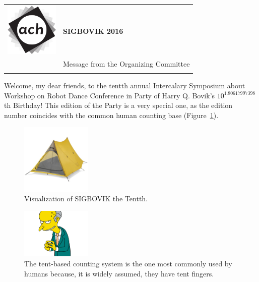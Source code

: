 \documentclass[12pt]{article}
\begin{document}
{\sffamily
\begin{tabular}{ll}
\multirow{3}{1in}{\includegraphics[width=1in]{ach.png}}\\
& \textbf{\Huge{SIGBOVIK 2016}} \\ &\\
& \LARGE{Message from the Organizing Committee} \\
&\\
\hline
\end{tabular}}
\vspace{2em}

Welcome, my dear friends, to the tentth annual
Intercalary Symposium about Workshop on Robot Dance Conference in Party of Harry Q. Bovik's $10^{1.80617997398}$th Birthday!
This edition of the Party is a very special one, as the edition number coincides with the common human counting base (Figure~\ref{fig:fingers}).

\begin{figure}[h]
	\centering
	\includegraphics[width=0.3\textwidth]{tent.jpg}
	\caption{Visualization of SIGBOVIK the Tentth.}
\end{figure}

\begin{figure}[h]
	\centering
	\includegraphics[width=0.3\textwidth]{tent-fingers.png}
	\caption{The tent-based counting system is the one most commonly used by humans because,
	it is widely assumed, they have tent fingers.} 
	\label{fig:fingers}
\end{figure}
\end{document}
